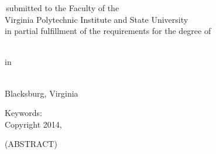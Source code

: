 \documentclass[12pt]{report}
\begin{document}
\thispagestyle{empty}


\begin{center}



{\Large
\mytitle
}


\vfill


\myauthor


\vfill


\myreporttype \,submitted to the Faculty of the \\
Virginia Polytechnic Institute and State University \\
in partial fulfillment of the requirements for the degree of


\vfill


\mydegree \\
in \\
\mydepartment


\vfill


\mycommittee


\vfill


\mydate \\
Blacksburg, Virginia


\vfill


Keywords: \mykeywords \\
Copyright 2014, \myauthor


\end{center}


\pagebreak


\thispagestyle{empty}

\begin{center}


{\large \mytitle}


\vfill


\myauthor


\vfill


(ABSTRACT)


\vfill


\end{center}

\myabstract


\vfill


\ifx\mygrants\undefined
\else
  \mygrants
\fi

\pagebreak


\ifx\mydedication\undefined
\else
\end{document}
